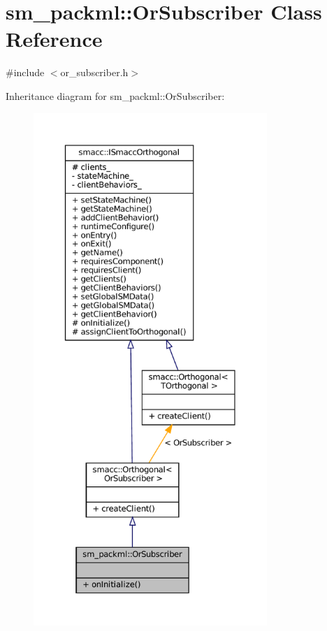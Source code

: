 \hypertarget{classsm__packml_1_1OrSubscriber}{}\section{sm\+\_\+packml\+:\+:Or\+Subscriber Class Reference}
\label{classsm__packml_1_1OrSubscriber}


{\ttfamily \#include $<$or\+\_\+subscriber.\+h$>$}



Inheritance diagram for sm\+\_\+packml\+:\+:Or\+Subscriber\+:
\nopagebreak
\begin{figure}[H]
\begin{center}
\leavevmode
\includegraphics[height=550pt]{classsm__packml_1_1OrSubscriber__inherit__graph}
\end{center}
\end{figure}


